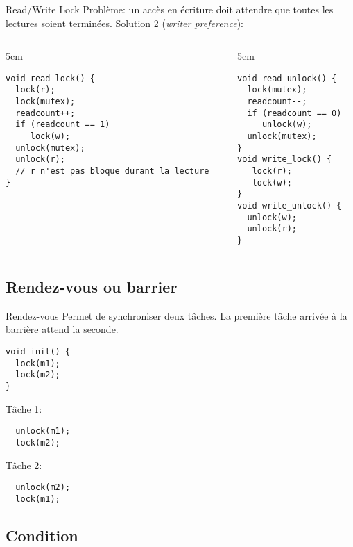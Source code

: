 \begin{frame}[fragile]{Read/Write Lock}
  Problème: un accès en écriture doit attendre que toutes les lectures
  soient terminées. Solution 2 (\emph{writer preference}):
  \begin{columns}
    \begin{column} {5cm}
      \begin{lstlisting} 
void read_lock() {
  lock(r);
  lock(mutex);
  readcount++;
  if (readcount == 1)
     lock(w);
  unlock(mutex);
  unlock(r);
  // r n'est pas bloque durant la lecture
}
       \end{lstlisting} 
     \end{column}
     \begin{column} {5cm}
       \begin{lstlisting} 
void read_unlock() {
  lock(mutex);
  readcount--;
  if (readcount == 0)
     unlock(w);
  unlock(mutex);
}
void write_lock() {
   lock(r);
   lock(w);
}
void write_unlock() {
  unlock(w);
  unlock(r);
}
      \end{lstlisting} 
    \end{column}
  \end{columns}
\end{frame} 

\subsection{Rendez-vous ou barrier}
\begin{frame}[fragile]{Rendez-vous}
  Permet de synchroniser  deux tâches. La première tâche  arrivée à la
  barrière attend la seconde.
\begin{lstlisting} 
void init() {
  lock(m1);
  lock(m2);
}
\end{lstlisting}
Tâche 1:
\begin{lstlisting} 
  unlock(m1);
  lock(m2);
\end{lstlisting} 
Tâche 2:
\begin{lstlisting} 
  unlock(m2);
  lock(m1);
\end{lstlisting} 
\end{frame}

\subsection{Condition}

